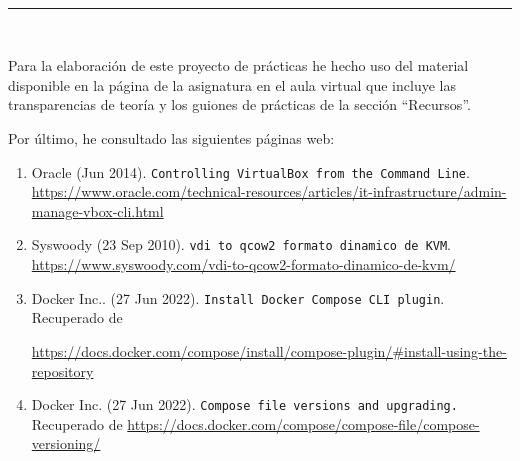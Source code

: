  \newpage
 \begin{center}
	{\fboxrule=4pt } \\
	\rule{15cm}{0pt} \\
\end{center}
\par Para la elaboración de este proyecto de prácticas he hecho uso del material disponible en la página de la asignatura en el aula virtual que incluye
las transparencias de teoría y los guiones de prácticas de la sección ``Recursos''.
\par Por último, he consultado las siguientes páginas web:
\begin{enumerate}
	\item Oracle (Jun 2014). \texttt{Controlling VirtualBox from the Command Line}.
	\url{https://www.oracle.com/technical-resources/articles/it-infrastructure/admin-manage-vbox-cli.html}
	\item Syswoody (23 Sep 2010). \texttt{vdi to qcow2 formato dinamico de KVM}.
	\url{https://www.syswoody.com/vdi-to-qcow2-formato-dinamico-de-kvm/}
	\item Docker Inc.. (27 Jun 2022). \texttt{Install Docker Compose CLI plugin}. Recuperado de 
	\raggedright\url{https://docs.docker.com/compose/install/compose-plugin/#install-using-the-repository}
	\item Docker Inc. (27 Jun 2022). \texttt{Compose file versions and upgrading.} Recuperado de 
	\url{https://docs.docker.com/compose/compose-file/compose-versioning/}
\end{enumerate}


